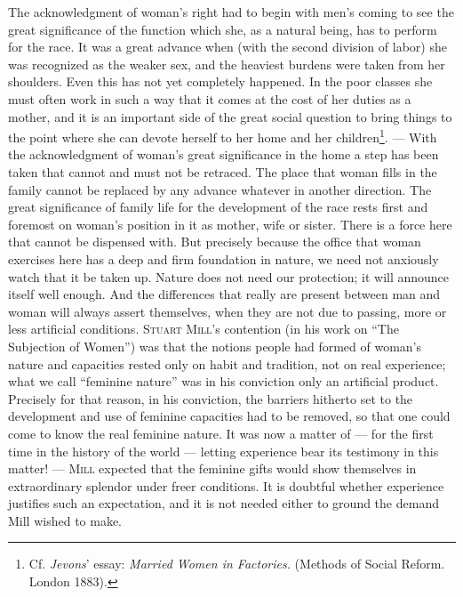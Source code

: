 \documentclass[12pt,a4paper,openany]{book}
\newcommand{\opage}[1]{\marginnote{\footnotesize\textit{[#1]}}}
\begin{document}
The acknowledgment of woman's right had to begin with men's coming to see the great significance of the function which
she, as a natural being, has to perform for the race. It was a great advance when (with the second division of labor)
she was recognized as the weaker sex, and the heaviest burdens were taken from her shoulders. Even this has not yet
completely happened. In the poor classes she must often work in such a way that it comes at the cost of
\opage{316}her duties as a mother, and it is an important side of the great social question to bring things to the
point where she can devote herself to her home and her children\footnote[1]{Cf. \emph{Jevons}' essay: \textit{Married
Women in Factories.} (Methods of Social Reform. London 1883).}. --- With the acknowledgment of woman's great significance
in the home a step has been taken that cannot and must not be retraced. The place that woman fills in the family cannot
be replaced by any advance whatever in another direction. The great significance of family life for the development of
the race rests first and foremost on woman's position in it as mother, wife or sister. There is a force here that cannot
be dispensed with. But precisely because the office that woman exercises here has a deep and firm foundation in nature,
we need not anxiously watch that it be taken up. Nature does not need our protection; it will announce itself well
enough. And the differences that really are present between man and woman will always assert themselves, when they are
not due to passing, more or less artificial conditions. \textsc{Stuart Mill}'s contention (in his work on ``The
Subjection of Women'') was that the notions people had formed of woman's nature and capacities rested only on habit and
tradition, not on real experience; what we call ``feminine nature'' was in his conviction only an artificial product.
Precisely for that reason, in his conviction, the barriers hitherto set to the development and use of feminine
capacities had to be removed, so that one could come to know the real feminine nature. It was now a matter of --- for the
first time in the history of the world --- letting experience bear its testimony in this matter! --- \textsc{Mill}
expected that the feminine gifts would show themselves in extraordinary splendor under freer conditions. It is doubtful
whether experience justifies such an expectation, and it is not needed either to ground the demand Mill wished to make.
\end{document}
